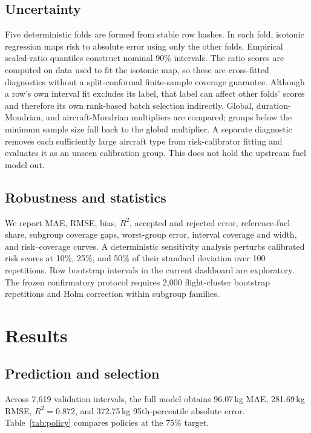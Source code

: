 \documentclass[11pt]{article}
\begin{document}
\subsection{Uncertainty}
Five deterministic folds are formed from stable row hashes. In each fold, isotonic regression maps risk to absolute error using only the other folds. Empirical scaled-ratio quantiles construct nominal 90\% intervals. The ratio scores are computed on data used to fit the isotonic map, so these are cross-fitted diagnostics without a split-conformal finite-sample coverage guarantee. Although a row's own interval fit excludes its label, that label can affect other folds' scores and therefore its own rank-based batch selection indirectly. Global, duration-Mondrian, and aircraft-Mondrian multipliers are compared; groups below the minimum sample size fall back to the global multiplier. A separate diagnostic removes each sufficiently large aircraft type from risk-calibrator fitting and evaluates it as an unseen calibration group. This does not hold the upstream fuel model out.

\subsection{Robustness and statistics}
We report MAE, RMSE, bias, $R^2$, accepted and rejected error, reference-fuel share, subgroup coverage gaps, worst-group error, interval coverage and width, and risk--coverage curves. A deterministic sensitivity analysis perturbs calibrated risk scores at 10\%, 25\%, and 50\% of their standard deviation over 100 repetitions. Row bootstrap intervals in the current dashboard are exploratory. The frozen confirmatory protocol requires 2,000 flight-cluster bootstrap repetitions and Holm correction within subgroup families.

\section{Results}
\subsection{Prediction and selection}
Across 7,619 validation intervals, the full model obtains 96.07\,kg MAE, 281.69\,kg RMSE, $R^2=0.872$, and 372.75\,kg 95th-percentile absolute error. Table~\ref{tab:policy} compares policies at the 75\% target.
\end{document}
